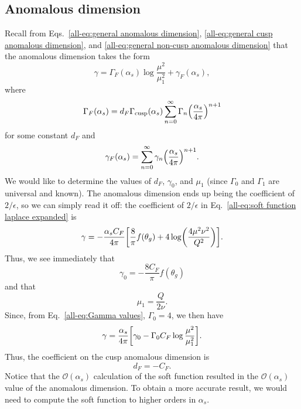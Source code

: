 \documentclass[../thesis.tex]{subfiles}
\providecommand{\cusp}{\mathrm{cusp}}
\providecommand{\cO}{\mathcal{O}}
\begin{document}
\subsection{Anomalous dimension}
	Recall from Eqs.~\ref{all-eq:general anomalous dimension}, \ref{all-eq:general cusp anomalous dimension}, and \ref{all-eq:general non-cusp anomalous dimension} that the anomalous dimension takes the form
	\begin{equation}
		\gamma = \Gamma_F(\alpha_s) \log\frac{\mu^2}{\mu_1^2} + \gamma_F(\alpha_s),
	\end{equation}
	where
	\begin{equation}
		\Gamma_F(\alpha_s) = d_F \Gamma_\cusp(\alpha_s) \sum_{n = 0}^\infty \Gamma_n \qty(\frac{\alpha_s}{4\pi})^{n + 1}
	\end{equation}
	for some constant $d_F$ and
	\begin{equation}
		\gamma_F(\alpha_s) = \sum_{n = 0}^\infty \gamma_n \qty(\frac{\alpha_s}{4\pi})^{n + 1}.
	\end{equation}
	We would like to determine the values of $d_F$, $\gamma_0$, and $\mu_1$ (since $\Gamma_0$ and $\Gamma_1$ are universal and known). The anomalous dimension ends up being the coefficient of $2/\epsilon$, so we can simply read it off: the coefficient of $2/\epsilon$ in Eq.~\ref{all-eq:soft function laplace expanded} is
	\begin{equation}
		\gamma = -\frac{\alpha_s C_F}{4\pi}\qty[\frac{8}{\pi} f(\theta_g) + 4\log(\frac{4\mu^2 \nu^2}{Q^2})].
	\end{equation}
	Thus, we see immediately that
	\begin{equation}\label{all-eq:gamma 0 value}
	\boxed{
		\gamma_0 = -\frac{8 C_F}{\pi}f(\theta_g)
	}
	\end{equation}
	and that
	\begin{equation}\label{all-eq:mu 1 value}
	\boxed{
		\mu_1 = \frac{Q}{2\nu}.
	}
	\end{equation}
	Since, from Eq.~\ref{all-eq:Gamma values}, $\Gamma_0 = 4$, we then have
	\begin{equation}
		\gamma = \frac{\alpha_s}{4\pi}\qty[\gamma_0 - \Gamma_0 C_F \log\frac{\mu^2}{\mu_1^2}].
	\end{equation}
	Thus, the coefficient on the cusp anomalous dimension is
	\begin{equation}
		\boxed{d_F = -C_F.}
	\end{equation}
	Notice that the $\cO(\alpha_s)$ calculation of the soft function resulted in the $\cO(\alpha_s)$ value of the anomalous dimension. To obtain a more accurate result, we would need to compute the soft function to higher orders in $\alpha_s$.
\end{document}
